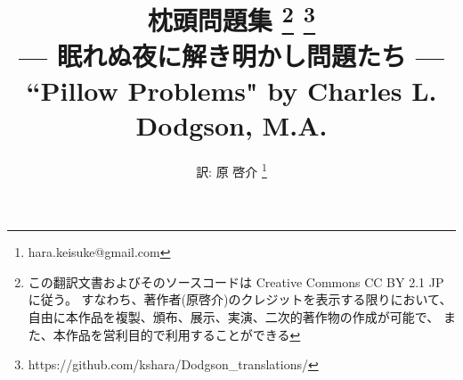 \documentclass{book}
\begin{document}
\title{枕頭問題集
    \footnote{この翻訳文書およびそのソースコードは
    Creative Commons CC BY 2.1 JP に従う。
    すなわち、著作者(原啓介)のクレジットを表示する限りにおいて、
    自由に本作品を複製、頒布、展示、実演、二次的著作物の作成が可能で、
    また、本作品を営利目的で利用することができる}
    \footnote{https://github.com/kshara/Dodgson\_translations/}
    \\
    {\normalsize --- 眠れぬ夜に解き明かし問題たち ---}
    \\
    ``Pillow Problems" by Charles L. Dodgson, M.A.
}
\author{訳: 原 啓介
    \footnote{hara.keisuke@gmail.com}
}
\maketitle

\tableofcontents






\end{document}
